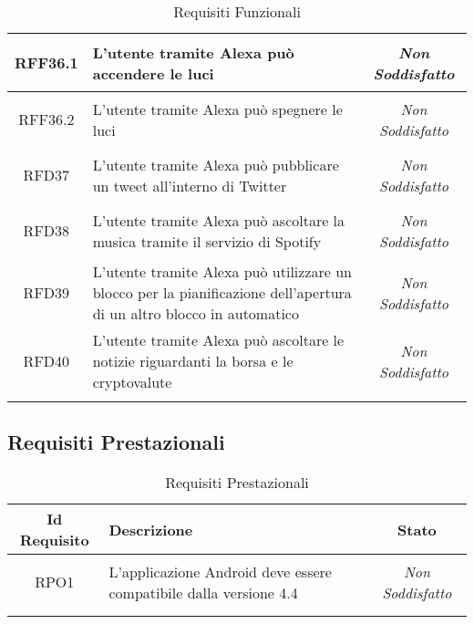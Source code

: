 \begin{longtable}{|c|>{\centering}m{7cm}|c|}
	\hypertarget{RFF36.1}{RFF36.1} & L'utente tramite Alexa può accendere le luci & \textit{Non Soddisfatto}\\ \hline
	
	\hypertarget{RFF36.2}{RFF36.2} & L'utente tramite Alexa può spegnere le luci & \textit{Non Soddisfatto}\\ \hline
	
	\hypertarget{RFD37}{RFD37} & L'utente tramite Alexa può pubblicare un tweet all'interno di Twitter & \textit{Non Soddisfatto}\\ \hline
	
	\hypertarget{RFD38}{RFD38} & L'utente tramite Alexa può ascoltare la musica tramite il servizio di Spotify & \textit{Non Soddisfatto}\\ \hline
	
	\hypertarget{RFD39}{RFD39} & L'utente tramite Alexa può utilizzare un blocco per la pianificazione dell'apertura di un altro blocco in automatico & \textit{Non Soddisfatto}\\ \hline
	
	\hypertarget{RFD40}{RFD40} & L'utente tramite Alexa può ascoltare le notizie riguardanti la borsa e le cryptovalute & \textit{Non Soddisfatto}\\ \hline
	
	\caption[Requisiti Funzionali]{Requisiti Funzionali}
	\label{tabella:req0}
\end{longtable}
\clearpage
\subsection{Requisiti Prestazionali}
\normalsize
\begin{longtable}{|c|>{\centering}m{7cm}|c|}
	\hline 
	\textbf{Id Requisito} & \textbf{Descrizione} & \textbf{Stato}\\
	\hline
	\endhead
	\hypertarget{RPO1}{RPO1} & L'applicazione Android deve essere compatibile dalla versione 4.4 & \textit{Non Soddisfatto}\\ \hline
	
	\caption[Requisiti Prestazionali]{Requisiti Prestazionali}
	\label{tabella:req1}
\end{longtable}
\clearpage
